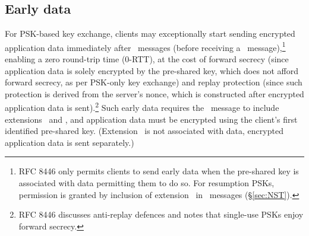 \subsection{Early data}\label{sec:handshakeEarlyData}

For PSK-based key exchange, clients may exceptionally start sending encrypted application data 
immediately after \ClientHello\ messages (before receiving a \ServerHello\ message),\footnote{%
  RFC 8446 only permits clients to send early data when the pre-shared key is associated with 
  data permitting them to do so. For resumption PSKs, permission is granted by inclusion of 
  extension \TLSearlyData\ in \NewSessionTicket\ messages (\S\ref{sec:NST}).
}
enabling 
a zero round-trip time (0-RTT), at the cost of forward secrecy 
(since application data is solely encrypted by the 
pre-shared key, %
which does not afford forward secrecy, as per PSK-only key exchange) and replay protection
(since such protection is derived from the server's nonce, which is constructed
after encrypted application data is sent).\footnote{
  RFC 8446 discusses anti-replay defences and notes that 
  single-use PSKs enjoy forward secrecy.
}
Such early data requires the
\ClientHello\ message to include extensions \TLSearlyData\ and \TLSpsk,
and 
application data must be encrypted using 
the client's first identified pre-shared key. (Extension \TLSearlyData\
is not associated with data, encrypted application data is sent separately.)


